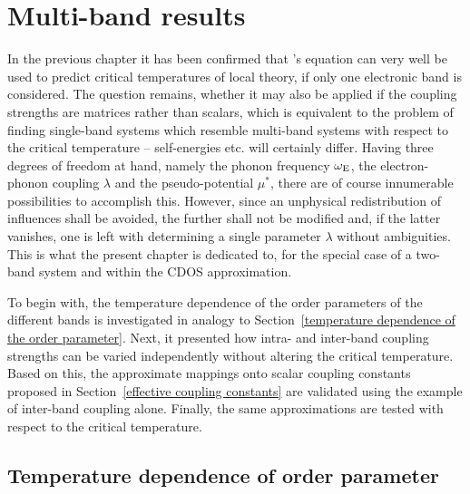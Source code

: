 
\chapter{Multi-band results}

In the previous chapter it has been confirmed that 's equation
can very well be used to predict critical temperatures of local
 theory, if only one electronic band is considered. The
question remains, whether it may also be applied if the coupling strengths are
matrices rather than scalars, which is equivalent to the problem of finding
single-band systems which resemble multi-band systems with respect to the
critical temperature -- self-energies etc. will certainly differ. Having three
degrees of freedom at hand, namely the phonon frequency $\omega \sb{\text{E}}$, the
electron-phonon coupling $\lambda$ and the  pseudo-potential
$\mu^*$, there are of course innumerable possibilities to accomplish this.
However, since an unphysical redistribution of influences shall be avoided, the
further shall not be modified and, if the latter vanishes, one is left with
determining a single parameter $\lambda$ without ambiguities. This is what the
present chapter is dedicated to, for the special case of a two-band system and
within the CDOS approximation.

To begin with, the temperature dependence of the order parameters of the
different bands is investigated in analogy to Section~\ref{temperature
dependence of the order parameter}. Next, it presented how intra- and inter-band
coupling strengths can be varied independently without altering the critical
temperature. Based on this, the approximate mappings onto scalar coupling
constants proposed in Section~\ref{effective coupling constants} are validated
using the example of inter-band coupling alone. Finally, the same approximations
are tested with respect to the critical temperature.

\section{Temperature dependence of order parameter}

